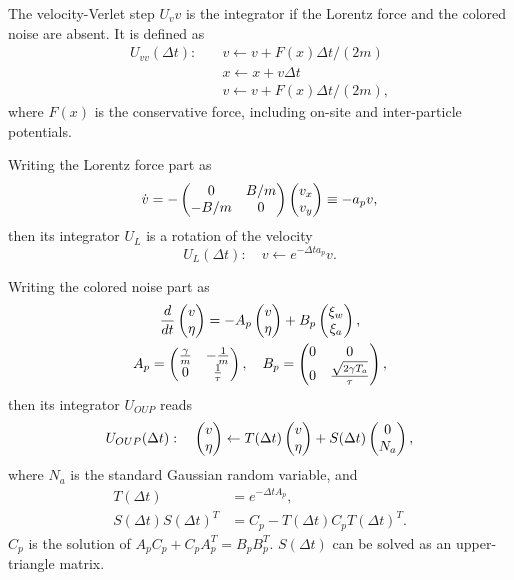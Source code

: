 \documentclass[
 amsmath,amssymb,
 aps,
 pre,
 longbibliography,
 10pt, onecolumn,
 notitlepage
]{revtex4-1}
\begin{document}
The velocity-Verlet step $U_vv$ is the integrator if the Lorentz force and the colored noise are absent. It is defined as
\begin{align}
U_{vv}(\Delta t):\quad
&v \leftarrow v + F(x) \Delta t / (2m) \\
&x \leftarrow x + v \Delta t \\
&v \leftarrow v + F(x) \Delta t / (2m),
\end{align}
where $F(x)$ is the conservative force, including on-site and inter-particle potentials.

Writing the Lorentz force part as
\begin{equation}
\dot{v} = -\pmqty{ 0 & B/m \\ -B/m & 0 } \pmqty{ v_x \\ v_y }
\equiv -a_p v ,
\end{equation}
then its integrator $U_L$ is a rotation of the velocity
\begin{equation}
    U_{L}(\Delta t):\quad
    v \leftarrow e^{-\Delta t a_p} v .
\end{equation}

Writing the colored noise part as
\begin{gather}
    \frac{d}{dt} \pmqty{ v \\ \eta }
    = -A_p \pmqty{ v \\ \eta } + B_p \pmqty{ \xi_w \\ \xi_a }, \\
    A_p = \pmqty{ \frac{\gamma}{m} & -\frac{1}{m} \\ 0 & \frac{1}{\tau} },\quad
    B_p = \pmqty{ 0 & 0 \\ 0 & \frac{\sqrt{2\gamma T_a}}{\tau} },
\end{gather}
then its integrator $U_{OUP}$ reads
\begin{equation}
    U_{OUP}(\Delta t):\quad
    \pmqty{ v \\ \eta } \leftarrow T(\Delta t) \pmqty{ v \\ \eta } + S(\Delta t) \pmqty{ 0 \\ N_a },
\end{equation}
where $N_a$ is the standard Gaussian random variable, and
\begin{align}
T(\Delta t) &= e^{-\Delta t A_p} ,\\
S(\Delta t)S(\Delta t)^T &= C_p - T(\Delta t) C_p T(\Delta t) ^T .
\end{align}
$C_p$ is the solution of $A_p C_p + C_p A_p^T = B_pB_p^T$.
$S(\Delta t)$ can be solved as an upper-triangle matrix.
\end{document}
